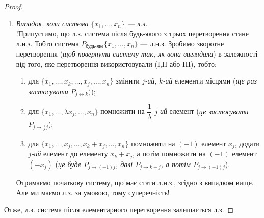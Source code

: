\documentclass{math_library}
\begin{document}
\begin{proof}
\begin{enumerate}[topsep=0pt, wide=0pt,label={\roman*.}]
	\item \textit{Випадок, коли система $\{x_1,\dots,x_n\}$ --- л.з.}\\
	!Припустимо, що л.з. система після будь-якого з трьох перетворення стане л.н.з. Тобто система $P_{\textrm{будь-яке}} \{x_1, \dots, x_n\}$ --- л.н.з. Зробимо зворотне перетворення (\textit{щоб повернути систему так, як вона виглядала}) в залежності від того, яке перетворення використовували (I,II або III), тобто:
	\begin{enumerate}[nosep, wide = 0pt, label={\Roman*.}]
	\item для $\{x_1,\dots,x_k, \dots, x_j, \dots,x_n\}$ змінити $j$\textit{-ий}, $k$\textit{-ий} елементи місцями (\textit{ще раз застосувати $P_{j \leftrightarrow k})$});
	\item для $\{x_1, \dots, \lambda x_j, \dots, x_n\}$ помножити на $\dfrac{1}{\lambda}$ $j$\textit{-ий} елемент (\textit{це застосувати $P_{j \to \frac{1}{\lambda} j}$});
	\item для $\{x_1, \dots, x_j, \dots,  x_k + x_j, \dots, x_n\}$ помножити на $(-1)$ елемент $x_j$, додати $j$\textit{-ий} елемент до елементу $x_k+x_j$, а потім помножити на $(-1)$ елемент $(-x_j)$ (\textit{це буде $P_{j \to (-1)j}$, далі $P_{j \to k+j}$, а потім $P_{j \to (-1)j}$}).
	\end{enumerate}
	Отримаємо початкову систему, що має стати л.н.з., згідно з випадком вище. Але ми маємо л.з. за умовою, тому суперечність!
	\end{enumerate}
	Отже, л.з. система після елементарного перетворення залишається л.з.
	\end{proof}
	
\end{document}
